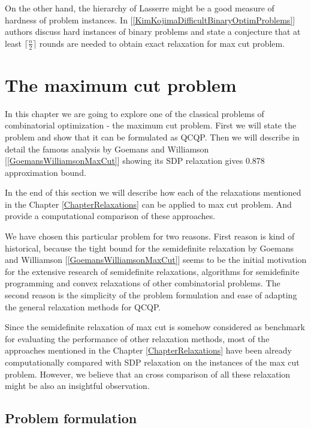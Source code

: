 \documentclass[12pt]{book}
\theoremstyle{definition}
\begin{document}
On the other hand, the hierarchy of Lasserre might be a good measure of hardness of problem instances. In [\ref{KimKojimaDifficultBinaryOptimProblems}]
authors discuss hard instances of binary problems and state a conjecture that at least $\lceil\frac{n}{2}\rceil$ rounds are needed to obtain exact relaxation for max cut problem.



\chapter{The maximum cut problem}

 In this chapter we are going to explore one of the classical problems of combinatorial optimization - the maximum cut problem. First we will state the problem and show that it can be formulated as QCQP. Then we will describe in detail the famous analysis by Goemans and Williamson [\ref{GoemansWilliamsonMaxCut}] showing its SDP relaxation gives 0.878 approximation bound. 
 
In the end of this section we will describe how each of the relaxations mentioned in the Chapter \ref{ChapterRelaxations} can be applied to max cut problem. And provide a computational comparison of these approaches.





We have chosen this particular problem for two reasons. First reason is kind of historical, because the tight bound for the semidefinite relaxation by Goemans and Williamson [\ref{GoemansWilliamsonMaxCut}] seems to be the initial motivation for the extensive research of semidefinite relaxations, algorithms for semidefinite programming and convex relaxations of other combinatorial problems. The second reason is the simplicity of the problem formulation and ease of adapting the general relaxation methods for QCQP.

Since the semidefinite relaxation of max cut is somehow considered as benchmark for evaluating the performance of other relaxation methods, 
most of the approaches mentioned in the Chapter \ref{ChapterRelaxations} have been already computationally compared with SDP relaxation on the instances of the max cut problem. However, we believe that an cross comparison of all these relaxation might be also an insightful observation.



\section{Problem formulation}
\end{document}
